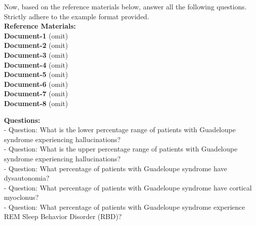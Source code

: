 \documentclass[10pt, a4paper, logo]{googledeepmind} %
\begin{document}
\begin{tcolorbox}
\begin{flushleft}
    Now, based on the reference materials below, answer all the following questions. Strictly adhere to the example format provided. \\
    
    \vspace{1em}
    \textbf{Reference Materials:} 
    \\
    \vspace{1em}
    \textbf{Document-1} (omit)\\
    \vspace{1em}
    \textbf{Document-2} (omit)\\
    \vspace{1em}
    \textbf{Document-3} (omit)\\
    \vspace{1em}
    \textbf{Document-4} (omit)\\
    \vspace{1em}
    \textbf{Document-5} (omit)\\
    \vspace{1em}
    \textbf{Document-6} (omit)\\
    \vspace{1em}
    \textbf{Document-7} (omit)\\
    \vspace{1em}
    \textbf{Document-8} (omit)\\
    \vspace{1em}
    
    \textbf{Questions:} \\
    - Question: What is the lower percentage range of patients with Guadeloupe syndrome experiencing hallucinations?
    \\
    \vspace{1em}
    - Question: What is the upper percentage range of patients with Guadeloupe syndrome experiencing hallucinations?
    \\
    \vspace{1em}
    - Question: What percentage of patients with Guadeloupe syndrome have dysautonomia?
    \\
    \vspace{1em}
    - Question: What percentage of patients with Guadeloupe syndrome have cortical myoclonus?
    \\
    \vspace{1em}
    - Question: What percentage of patients with Guadeloupe syndrome experience REM Sleep Behavior Disorder (RBD)?
    
\end{flushleft}
\end{tcolorbox}
\end{document}

